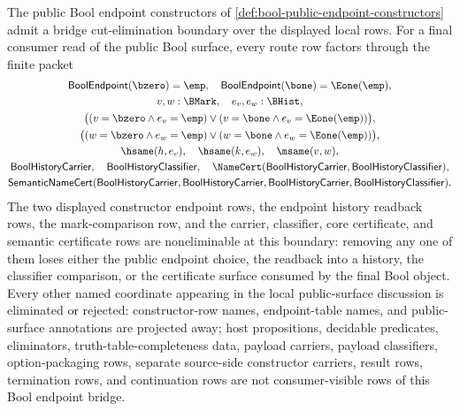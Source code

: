 \begin{lemma}
\label{lem:bool-public-endpoint-bridge-cut-elimination-boundary}
The public Bool endpoint constructors of \autoref{def:bool-public-endpoint-constructors} admit a bridge cut-elimination boundary over the displayed local rows. For a final consumer read of the public Bool surface, every route row factors through the finite packet
$$
\begin{gathered}
\mathsf{BoolEndpoint}(\bzero)=\emp,\quad
\mathsf{BoolEndpoint}(\bone)=\Eone(\emp),\\
v,w:\BMark,\quad e_v,e_w:\BHist,\\
\bigl((v=\bzero \land e_v=\emp) \lor (v=\bone \land e_v=\Eone(\emp))\bigr),\\
\bigl((w=\bzero \land e_w=\emp) \lor (w=\bone \land e_w=\Eone(\emp))\bigr),\\
\hsame(h,e_v),\quad
\hsame(k,e_w),\quad
\msame(v,w),\\
\mathsf{BoolHistoryCarrier},\quad
\mathsf{BoolHistoryClassifier},\quad
\NameCert(\mathsf{BoolHistoryCarrier},\mathsf{BoolHistoryClassifier}),\\
\mathsf{SemanticNameCert}(\mathsf{BoolHistoryCarrier},\mathsf{BoolHistoryCarrier},
\mathsf{BoolHistoryCarrier},\mathsf{BoolHistoryClassifier}).
\end{gathered}
$$
The two displayed constructor endpoint rows, the endpoint history readback rows, the mark-comparison row, and the carrier, classifier, core certificate, and semantic certificate rows are noneliminable at this boundary: removing any one of them loses either the public endpoint choice, the readback into a history, the classifier comparison, or the certificate surface consumed by the final Bool object. Every other named coordinate appearing in the local public-surface discussion is eliminated or rejected: constructor-row names, endpoint-table names, and public-surface annotations are projected away; host propositions, decidable predicates, eliminators, truth-table-completeness data, payload carriers, payload classifiers, option-packaging rows, separate source-side constructor carriers, result rows, termination rows, and continuation rows are not consumer-visible rows of this Bool endpoint bridge.
\end{lemma}
